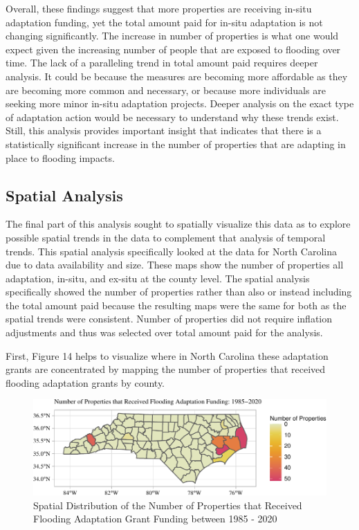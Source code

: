 \documentclass[
  12pt,
]{article}
\begin{document}
Overall, these findings suggest that more properties are receiving
in-situ adaptation funding, yet the total amount paid for in-situ
adaptation is not changing significantly. The increase in number of
properties is what one would expect given the increasing number of
people that are exposed to flooding over time. The lack of a paralleling
trend in total amount paid requires deeper analysis. It could be because
the measures are becoming more affordable as they are becoming more
common and necessary, or because more individuals are seeking more minor
in-situ adaptation projects. Deeper analysis on the exact type of
adaptation action would be necessary to understand why these trends
exist. Still, this analysis provides important insight that indicates
that there is a statistically significant increase in the number of
properties that are adapting in place to flooding impacts.

\hypertarget{spatial-analysis}{%
\subsection{Spatial Analysis}\label{spatial-analysis}}

The final part of this analysis sought to spatially visualize this data
as to explore possible spatial trends in the data to complement that
analysis of temporal trends. This spatial analysis specifically looked
at the data for North Carolina due to data availability and size. These
maps show the number of properties all adaptation, in-situ, and ex-situ
at the county level. The spatial analysis specifically showed the number
of properties rather than also or instead including the total amount
paid because the resulting maps were the same for both as the spatial
trends were consistent. Number of properties did not require inflation
adjustments and thus was selected over total amount paid for the
analysis.

First, Figure 14 helps to visualize where in North Carolina these
adaptation grants are concentrated by mapping the number of properties
that received flooding adaptation grants by county.

\begin{figure}
\centering
\includegraphics{finalreport_files/figure-latex/unnamed-chunk-28-1.pdf}
\caption{Spatial Distribution of the Number of Properties that Received
Flooding Adaptation Grant Funding between 1985 - 2020}
\end{figure}
\end{document}
